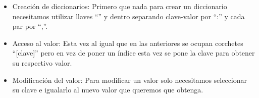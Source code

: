 \begin{itemize}
    \item Creación de diccionarios: Primero que nada para crear un diccionario necesitamos utilizar llaves ``{}'' y dentro separando clave-valor por ``:'' y cada par por ``,''.
    \begin{figure}[h]
        \centering
      \end{figure}
    
    \item Acceso al valor: Esta vez al igual que en las anteriores se ocupan corchetes ``[clave]'' pero en vez de poner un índice esta vez se pone la clave para obtener su respectivo valor.
    \begin{figure}[h]
        \centering
      \end{figure}
    
    \item Modificación del valor: Para modificar un valor solo necesitamos seleccionar su clave e igualarlo al nuevo valor que queremos que obtenga.
    \begin{figure}[h]
        \centering
      \end{figure}
    

\end{itemize}
